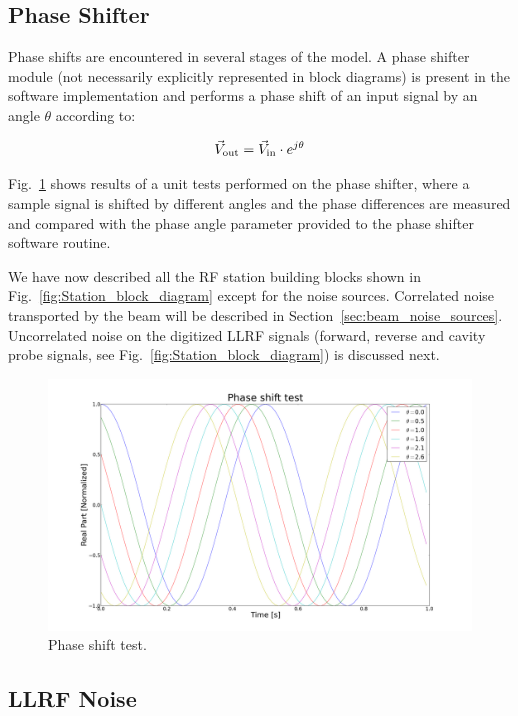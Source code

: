 \documentclass[a4paper,12pt]{article}
\begin{document}
\subsection{Phase Shifter}

Phase shifts are encountered in several stages of the model. A phase shifter module (not necessarily explicitly represented in block diagrams) is present in the software implementation and performs a phase shift of an input signal by an angle $\theta$ according to:

\begin{equation}
  \vec V_{\rm out} = \vec V_{\rm in} \cdot e^{j\theta}
\end{equation}

Fig.~\ref{fig:phase_shfiter_test} shows results of a unit tests performed on the phase shifter, where a sample signal is shifted by different angles and the phase differences are measured and compared with the phase angle parameter provided to the phase shifter software routine.

We have now described all the RF station building blocks shown in Fig.~\ref{fig:Station_block_diagram} except for the noise sources. Correlated noise transported by the beam will be described in Section~\ref{sec:beam_noise_sources}. Uncorrelated noise on the digitized LLRF signals (forward, reverse and cavity probe signals, see Fig.~\ref{fig:Station_block_diagram}) is discussed next.

\begin{figure}
\centering
\includegraphics[scale=0.265]{../figures/phase_shift_test.png}
\caption{Phase shift test.}
\label{fig:phase_shfiter_test}
\end{figure}

\subsection{LLRF Noise}
\label{sec:llrf_noise}
\end{document}
